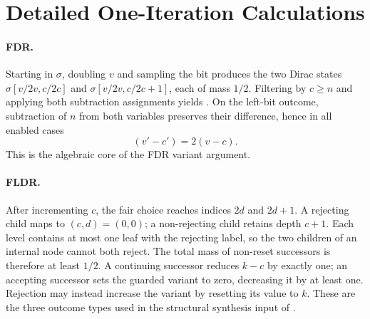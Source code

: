 \section{Detailed One-Iteration Calculations}
\label{app:calculations}

\paragraph{FDR.}
Starting in $\sigma$, doubling $v$ and sampling the bit produces the two Dirac states $\sigma[v/2v,c/2c]$ and $\sigma[v/2v,c/2c+1]$, each of mass $1/2$. Filtering by $c\ge n$ and applying both subtraction assignments yields . On the left-bit outcome, subtraction of $n$ from both variables preserves their difference, hence in all enabled cases
\[
 (v'-c')=2(v-c).
\]
This is the algebraic core of the FDR variant argument.

\paragraph{FLDR.}
After incrementing $c$, the fair choice reaches indices $2d$ and $2d+1$. A rejecting child maps to $(c,d)=(0,0)$; a non-rejecting child retains depth $c+1$. Each level contains at most one leaf with the rejecting label, so the two children of an internal node cannot both reject. The total mass of non-reset successors is therefore at least $1/2$. A continuing successor reduces $k-c$ by exactly one; an accepting successor sets the guarded variant to zero, decreasing it by at least one. Rejection may instead increase the variant by resetting its value to $k$. These are the three outcome types used in the structural synthesis input of .
